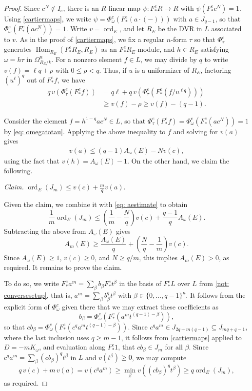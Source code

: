 \documentclass[11pt,leqno]{amsart}
\numberwithin{equation}{section}
\theoremstyle{definition}
\theoremstyle{remark}
\newcommand{\ord}{\operatorname{ord}}
\DeclareMathOperator{\Hom}{Hom}
\begin{document}
\begin{proof}
Since $c^N \notin I_e$, there is an $R$-linear map $\psi: F^e_*R \to R$ with $\psi(F^e_*c^N) = 1$. Using \cref{cartiermaps}, we write $\psi = \Phi^e_\omega(F^e_*(a \cdot (-)))$ with $a \in J_{q - 1}$, so that $\Phi^e_{\omega}(F^e_*(ac^N)) = 1$. Write $v = \ord_E$, and let $R_E$ be the DVR in $L$ associated to $v$. As in the proof of \cref{cartiermaps}, we fix a regular $n$-form $\tau$ so that $\Phi^e_\tau$ generates $\Hom_{R_E}(F^e_*R_E, R_E)$ as an $F^e_*R_E$-module, and $h \in R_E$ satisfying $\omega = h\tau$ in $\Omega^n_{R_E/k}$. For a nonzero element $f \in L$, we may divide by $q$ to write $v(f) = \ell q + \rho$ with $0 \leq \rho < q$. Thus, if $u$ is a uniformizer of $R_E$, factoring $(u^\ell)^q$ out of $F^e_*f$, we have \begin{align*}
q\,v(\Phi^e_\tau(F^e_*f)) &= q\ell + q\,v(\Phi^e_{\tau}(F^e_*(f/u^{\ell q}))) \\&\geq v(f) - \rho \geq v(f) - (q - 1).
\end{align*}

Consider the element $f = h^{1 -q}ac^N \in L$, so that $\Phi^e_\tau(F^e_*f) = \Phi^e_{\omega}(F^e_*(ac^N)) = 1$ by \cref{eq: omegatotau}. Applying the above inequality to $f$ and solving for $v(a)$ gives \begin{align} \label{eq: aestimate} v(a) \leq (q - 1)A_{\omega}(E) - N v(c), \end{align} using the fact that $v(h) = A_\omega(E) - 1$. On the other hand, we claim the following.

\noindent\textit{Claim.} $\ord_E(J_m) \leq v(c) + \frac{m}{q}v(a)$.

\noindent Given the claim, we combine it with \cref{eq: aestimate} to obtain $$\frac{1}{m}\ord_E(J_m) \leq \left( \frac{1}{m} - \frac{N}{q}\right) v(c) + \frac{q - 1}{q} A_\omega(E).$$ Subtracting the above from $A_\omega(E)$ gives $$A_m(E) \geq \frac{A_\omega(E)}{q} + \left( \frac{N}{q}- \frac{1}{m} \right) v(c).$$ Since $A_{\omega}(E) \geq 1$, $v(c) \geq 0$, and $N \geq q/m$, this implies $A_m(E) > 0$, as required. It remains to prove the claim.

To do so, we write $F^e_*a^m = \sum_\beta b_\beta F^e_* t^\beta$ in the basis of $F^e_*L$ over $L$ from \cref{not: conversesetup}, that is, $a^m = \sum_\beta b_\beta^q t^\beta$ with $\beta \in \{0, \dots, q-1\}^n$. It follows from the explicit form of $\Phi_\omega^e$ given there that we may extract these coefficients as $$b_\beta = \Phi^e_\omega(F^e_*(a^m t^{(q - 1) - \beta})),$$ so that $cb_\beta = \Phi^e_\omega(F^e_*(c^qa^m t^{(q-1)-\beta}))$. Since $c^qa^m \in J_{2q + m(q-1)} \subseteq J_{mq + q - 1}$, where the last inclusion uses $q \geq m - 1$, it follows from \cref{cartiermaps} applied to $D = -mK_\omega$, and evaluation along $F^e_*1$, that $c b_\beta \in J_m$ for all $\beta$. Since $c^qa^m = \sum_\beta (cb_\beta)^q t^\beta$ in $L$ and $v(t^\beta) \geq 0$, we may compute $$q\,v(c) + m\,v(a) = v(c^q a^m)  \geq \min_\beta v((cb_\beta)^q t^\beta) \geq q \ord_E(J_m),$$ as required.
\end{proof}
\end{document}
